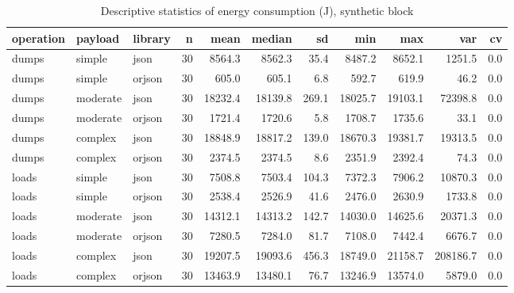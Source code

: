 \begin{table}[ht]
\centering
\begin{tabular}{lllrrrrrrrr}
  \toprule
operation & payload & library & n & mean & median & sd & min & max & var & cv \\ 
  \midrule
dumps & simple & json & 30 & 8564.3 & 8562.3 & 35.4 & 8487.2 & 8652.1 & 1251.5 & 0.0 \\ 
  dumps & simple & orjson & 30 & 605.0 & 605.1 & 6.8 & 592.7 & 619.9 & 46.2 & 0.0 \\ 
  dumps & moderate & json & 30 & 18232.4 & 18139.8 & 269.1 & 18025.7 & 19103.1 & 72398.8 & 0.0 \\ 
  dumps & moderate & orjson & 30 & 1721.4 & 1720.6 & 5.8 & 1708.7 & 1735.6 & 33.1 & 0.0 \\ 
  dumps & complex & json & 30 & 18848.9 & 18817.2 & 139.0 & 18670.3 & 19381.7 & 19313.5 & 0.0 \\ 
  dumps & complex & orjson & 30 & 2374.5 & 2374.5 & 8.6 & 2351.9 & 2392.4 & 74.3 & 0.0 \\ 
  loads & simple & json & 30 & 7508.8 & 7503.4 & 104.3 & 7372.3 & 7906.2 & 10870.3 & 0.0 \\ 
  loads & simple & orjson & 30 & 2538.4 & 2526.9 & 41.6 & 2476.0 & 2630.9 & 1733.8 & 0.0 \\ 
  loads & moderate & json & 30 & 14312.1 & 14313.2 & 142.7 & 14030.0 & 14625.6 & 20371.3 & 0.0 \\ 
  loads & moderate & orjson & 30 & 7280.5 & 7284.0 & 81.7 & 7108.0 & 7442.4 & 6676.7 & 0.0 \\ 
  loads & complex & json & 30 & 19207.5 & 19093.6 & 456.3 & 18749.0 & 21158.7 & 208186.7 & 0.0 \\ 
  loads & complex & orjson & 30 & 13463.9 & 13480.1 & 76.7 & 13246.9 & 13574.0 & 5879.0 & 0.0 \\ 
   \bottomrule
\end{tabular}
\caption{Descriptive statistics of energy consumption (J), synthetic block} 
\label{tab:desc_energy}
\end{table}
